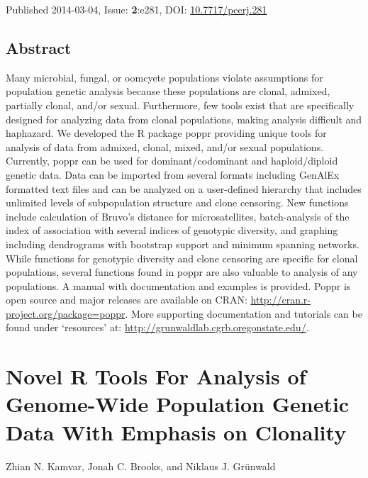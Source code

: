 \documentclass[double,12pt]{beavtex}
\begin{document}
  Published 2014-03-04, Issue: \textbf{2}:e281, DOI:
  \href{https://dx.doi.org/10.7717/peerj.281}{10.7717/peerj.281}
  
  \doublespacing
  \newpage
  
  \section{Abstract}\label{abstract}
  
  Many microbial, fungal, or oomcyete populations violate assumptions for
  population genetic analysis because these populations are clonal,
  admixed, partially clonal, and/or sexual. Furthermore, few tools exist
  that are specifically designed for analyzing data from clonal
  populations, making analysis difficult and haphazard. We developed the R
  package poppr providing unique tools for analysis of data from admixed,
  clonal, mixed, and/or sexual populations. Currently, poppr can be used
  for dominant/codominant and haploid/diploid genetic data. Data can be
  imported from several formats including GenAlEx formatted text files and
  can be analyzed on a user-defined hierarchy that includes unlimited
  levels of subpopulation structure and clone censoring. New functions
  include calculation of Bruvo's distance for microsatellites,
  batch-analysis of the index of association with several indices of
  genotypic diversity, and graphing including dendrograms with bootstrap
  support and minimum spanning networks. While functions for genotypic
  diversity and clone censoring are specific for clonal populations,
  several functions found in poppr are also valuable to analysis of any
  populations. A manual with documentation and examples is provided. Poppr
  is open source and major releases are available on CRAN:
  \url{http://cran.r-project.org/package=poppr}. More supporting
  documentation and tutorials can be found under `resources' at:
  \url{http://grunwaldlab.cgrb.oregonstate.edu/}.
  
  \chapter{Novel R Tools For Analysis of Genome-Wide Population Genetic
  Data With Emphasis on
  Clonality}\label{novel-r-tools-for-analysis-of-genome-wide-population-genetic-data-with-emphasis-on-clonality}
  
  \singlespacing
  
  \begin{center}
  
  Zhian N. Kamvar, Jonah C. Brooks, and Niklaus J. Grünwald
  
  
  
  \end{center}\vspace*{\fill}
  
\end{document}
